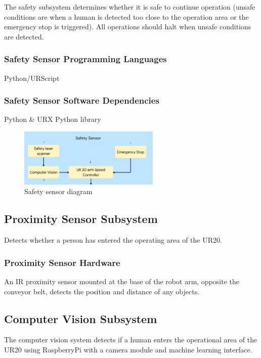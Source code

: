 
The safety subsystem determines whether it is safe to continue operation (unsafe conditions are when a human is detected too close to the operation area or the emergency stop is triggered). All operations should halt when unsafe conditions are detected.

\subsubsection{Safety Sensor Programming Languages}
Python/URScript

\subsubsection{Safety Sensor Software Dependencies}
Python \& URX Python library

\begin{figure}[h!]
	\centering
 	\includegraphics[width=0.60\textwidth]{images/safety.png}
 \caption{Safety sensor diagram}
\end{figure}

\subsection{Proximity Sensor Subsystem}
Detects whether a person has entered the operating area of the UR20. 

\subsubsection{Proximity Sensor Hardware}
An IR proximity sensor mounted at the base of the robot arm, opposite the conveyor belt, detects the position and distance of any objects.

\subsection{Computer Vision Subsystem}
The computer vision system detects if a human enters the operational area of the UR20 using RaspberryPi with a camera module and machine learning interface.

